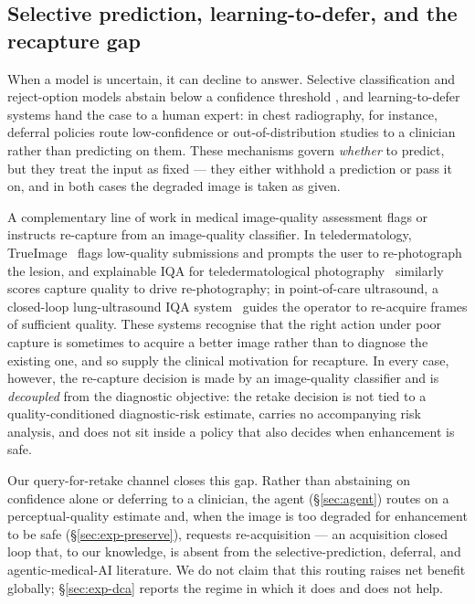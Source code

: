 \subsection{Selective prediction, learning-to-defer, and the recapture gap}
\label{subsec:rel-selective}

When a model is uncertain, it can decline to answer. Selective classification
and reject-option models abstain below a confidence threshold
\citep{geifman2017selective,geifman2019selectivenet}, and learning-to-defer
systems hand the case to a human expert: in chest radiography, for instance,
deferral policies route low-confidence or out-of-distribution studies to a
clinician rather than predicting on them. These mechanisms govern \emph{whether}
to predict, but they treat the input as fixed --- they either withhold a
prediction or pass it on, and in both cases the degraded image is taken as given.

A complementary line of work in medical image-quality assessment flags or
instructs re-capture from an image-quality classifier. In teledermatology,
TrueImage~\citep{vodrahalli2021teledermatology} flags low-quality submissions and
prompts the user to re-photograph the lesion, and explainable IQA for
teledermatological photography~\citep{jalaboi2023explainable} similarly scores
capture quality to drive re-photography; in point-of-care ultrasound, a
closed-loop lung-ultrasound IQA system~\citep{zhao2020lungus} guides the operator
to re-acquire frames of sufficient quality. These systems recognise that the right
action under poor capture is sometimes to acquire a better image rather than to
diagnose the existing one, and so supply the clinical motivation for recapture.
In every case, however, the re-capture decision is made by an image-quality
classifier and is \emph{decoupled} from the diagnostic objective: the retake
decision is not tied to a quality-conditioned diagnostic-risk estimate, carries no
accompanying risk analysis, and does not sit inside a policy that also decides when
enhancement is safe.

Our query-for-retake channel closes this gap. Rather than abstaining on
confidence alone or deferring to a clinician, the agent (\S\ref{sec:agent})
routes on a perceptual-quality estimate and, when the image is too degraded for
enhancement to be safe (\S\ref{sec:exp-preserve}), requests re-acquisition ---
an acquisition closed loop that, to our knowledge, is absent from the selective-prediction,
deferral, and agentic-medical-AI literature. We do not claim that this routing
raises net benefit globally; \S\ref{sec:exp-dca} reports the regime in which it
does and does not help.


